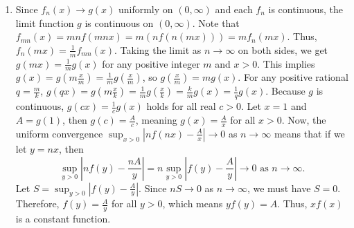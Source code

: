 \documentclass{article}
\begin{document}
\begin{enumerate}[label=\fbox{\arabic*}]
  \item %
        Since $f_n(x) \to g(x)$ uniformly on $(0, \infty)$ and each $f_n$ is continuous, the limit function $g$ is continuous on $(0, \infty)$.
        Note that $f_{mn}(x) = mn f(mnx) = m (n f(n(mx))) = m f_n(mx)$. Thus, $f_n(mx) = \frac{1}{m} f_{mn}(x)$.
        Taking the limit as $n \to \infty$ on both sides, we get $g(mx) = \frac{1}{m} g(x)$ for any positive integer $m$ and $x > 0$.
        This implies $g(x) = g\left(m \frac{x}{m}\right) = \frac{1}{m} g\left(\frac{x}{m}\right)$, so $g\left(\frac{x}{m}\right) = m g(x)$.
        For any positive rational $q = \frac{m}{k}$, $g(qx) = g\left(m \frac{x}{k}\right) = \frac{1}{m} g\left(\frac{x}{k}\right) = \frac{k}{m} g(x) = \frac{1}{q} g(x)$.
        Because $g$ is continuous, $g(cx) = \frac{1}{c} g(x)$ holds for all real $c > 0$.
        Let $x = 1$ and $A = g(1)$, then $g(c) = \frac{A}{c}$, meaning $g(x) = \frac{A}{x}$ for all $x > 0$.
        Now, the uniform convergence $\sup_{x > 0} \left|nf(nx) - \frac{A}{x}\right| \to 0$ as $n \to \infty$ means that if we let $y = nx$, then
        \[
          \sup_{y > 0} \left|n f(y) - \frac{nA}{y}\right| = n \sup_{y > 0} \left|f(y) - \frac{A}{y}\right| \to 0 \text{ as } n \to \infty.
        \]
        Let $S = \sup_{y > 0} \left|f(y) - \frac{A}{y}\right|$. Since $nS \to 0$ as $n \to \infty$, we must have $S = 0$.
        Therefore, $f(y) = \frac{A}{y}$ for all $y > 0$, which means $y f(y) = A$. Thus, $xf(x)$ is a constant function.


\end{enumerate}
\end{document}
